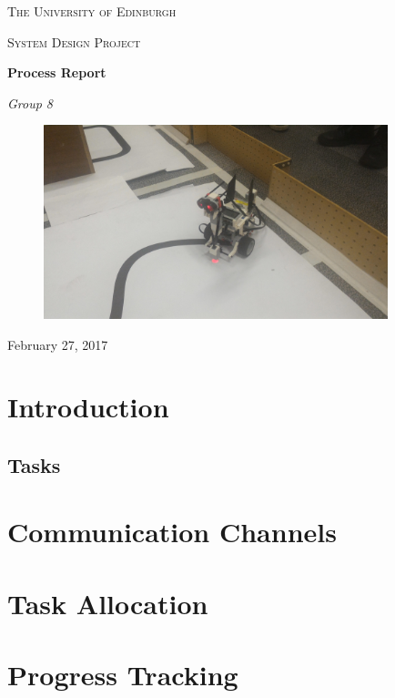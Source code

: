 \documentclass[a4paper,12pt]{article}
\begin{document}
\begin{titlepage}
	\centering
	{\scshape\LARGE The University of Edinburgh \par}
	\vspace{1cm}
	{\scshape\Large System Design Project\par}
	\vspace{1.5cm}
	{\huge\bfseries Process Report\par}
	\vspace{2cm}
	{\Large\itshape Group 8\par}
	\vfill
\begin{figure}[H]
    \centering
    \includegraphics[width=10cm]{robot}
    \label{fig:robot}
\end{figure}
	\vfill

	{\large February 27, 2017\par}
\end{titlepage}

\section{Introduction}
\subsection{Tasks}


\section{Communication Channels}


\section{Task Allocation}


\section{Progress Tracking}

\end{document}
